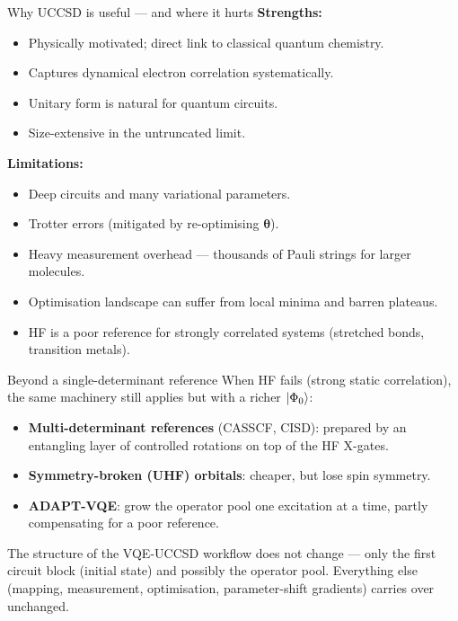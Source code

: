 \documentclass[10pt,aspectratio=169]{beamer}
\begin{document}
\begin{frame}{Why UCCSD is useful --- and where it hurts}
\textbf{Strengths:}
\begin{itemize}
  \item Physically motivated; direct link to classical quantum chemistry.
  \item Captures dynamical electron correlation systematically.
  \item Unitary form is natural for quantum circuits.
  \item Size-extensive in the untruncated limit.
\end{itemize}

\medskip
\textbf{Limitations:}
\begin{itemize}
  \item Deep circuits and many variational parameters.
  \item Trotter errors (mitigated by re-optimising $\bm\theta$).
  \item Heavy measurement overhead --- thousands of Pauli strings for larger molecules.
  \item Optimisation landscape can suffer from local minima and barren plateaus.
  \item HF is a poor reference for strongly correlated systems (stretched bonds, transition metals).
\end{itemize}
\end{frame}

\begin{frame}{Beyond a single-determinant reference}
When HF fails (strong static correlation), the same machinery still applies but with a richer $\ket{\Phi_0}$:
\begin{itemize}
  \item \textbf{Multi-determinant references} (CASSCF, CISD): prepared by an entangling layer of controlled rotations on top of the HF X-gates.
  \item \textbf{Symmetry-broken (UHF) orbitals}: cheaper, but lose spin symmetry.
  \item \textbf{ADAPT-VQE}: grow the operator pool one excitation at a time, partly compensating for a poor reference.
\end{itemize}

\medskip
The structure of the VQE-UCCSD workflow does not change --- only the first circuit block (initial state) and possibly the operator pool. Everything else (mapping, measurement, optimisation, parameter-shift gradients) carries over unchanged.
\end{frame}
\end{document}

